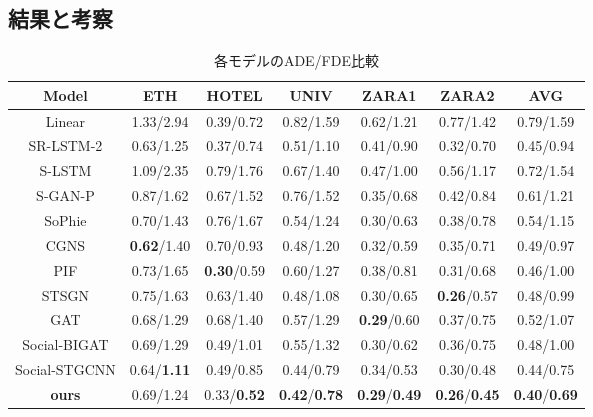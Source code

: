 \subsection{結果と考察}
\begin{table}[hbtp]
  \centering
  \caption{各モデルのADE/FDE比較\protect\footnotemark[6]}
  \label{tab:val-results}
  \footnotesize
  \begin{tabular}{c||c|c|c|c|c|c}
  Model & ETH & HOTEL & UNIV & ZARA1 & ZARA2 & AVG \\
  \hline \hline
  Linear \cite{s-lstm} & 1.33/2.94 & 0.39/0.72 & 0.82/1.59 & 0.62/1.21 & 0.77/1.42 & 0.79/1.59 \\
  \hline
  SR-LSTM-2 \cite{sr-lstm} & 0.63/1.25 & 0.37/0.74 & 0.51/1.10 & 0.41/0.90 & 0.32/0.70 & 0.45/0.94 \\
  \hline
  S-LSTM \cite{s-lstm} & 1.09/2.35 & 0.79/1.76 & 0.67/1.40 & 0.47/1.00 & 0.56/1.17 & 0.72/1.54 \\
  \hline
  S-GAN-P \cite{gupta2018social-s-gan-p} & 0.87/1.62 & 0.67/1.52 & 0.76/1.52 & 0.35/0.68 & 0.42/0.84 & 0.61/1.21 \\
  \hline
  SoPhie \cite{sadeghian2019sophie} & 0.70/1.43 & 0.76/1.67 & 0.54/1.24 & 0.30/0.63 & 0.38/0.78 & 0.54/1.15 \\
  \hline
  CGNS \cite{li2019conditional-cgns} & \textbf{0.62}/1.40 & 0.70/0.93 & 0.48/1.20 & 0.32/0.59 & 0.35/0.71 & 0.49/0.97 \\
  \hline
  PIF \cite{liang2019peeking-pif} & 0.73/1.65 & \textbf{0.30}/0.59 & 0.60/1.27 & 0.38/0.81 & 0.31/0.68 & 0.46/1.00 \\
  \hline
  STSGN \cite{zhang2019stochastic-stsgn} & 0.75/1.63 & 0.63/1.40 & 0.48/1.08 & 0.30/0.65 & \textbf{0.26}/0.57 & 0.48/0.99 \\
  \hline
  GAT \cite{s-bigat} & 0.68/1.29 & 0.68/1.40 & 0.57/1.29 & \textbf{0.29}/0.60 & 0.37/0.75 & 0.52/1.07 \\
  \hline
  Social-BIGAT \cite{s-bigat} & 0.69/1.29 & 0.49/1.01 & 0.55/1.32 & 0.30/0.62 & 0.36/0.75 & 0.48/1.00 \\
  \hline
  Social-STGCNN\cite{s-stgcnn} & 0.64/\textbf{1.11} & 0.49/0.85 & 0.44/0.79 & 0.34/0.53 & 0.30/0.48 & 0.44/0.75 \\
  \hline \hline
  \textbf{ours} & 0.69/1.24 & 0.33/\textbf{0.52} & \textbf{0.42}/\textbf{0.78} & \textbf{0.29}/\textbf{0.49} & \textbf{0.26}/\textbf{0.45} & \textbf{0.40}/\textbf{0.69} \\
  \hline
  \end{tabular}
\end{table}

